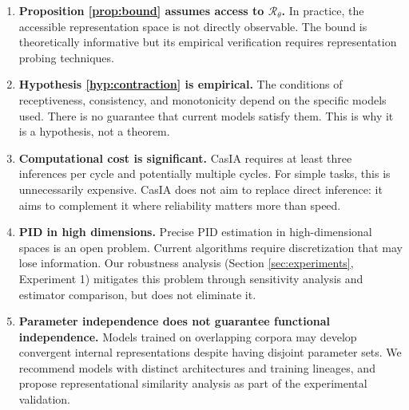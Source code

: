 \documentclass[11pt,a4paper]{article}
\theoremstyle{remark}
\begin{document}
\begin{enumerate}
  \item \textbf{Proposition \ref{prop:bound} assumes access to $\mathcal{R}_\theta$.} In practice, the accessible representation space is not directly observable. The bound is theoretically informative but its empirical verification requires representation probing techniques.
  
  \item \textbf{Hypothesis \ref{hyp:contraction} is empirical.} The conditions of receptiveness, consistency, and monotonicity depend on the specific models used. There is no guarantee that current models satisfy them. This is why it is a hypothesis, not a theorem.
  
  \item \textbf{Computational cost is significant.} CasIA requires at least three inferences per cycle and potentially multiple cycles. For simple tasks, this is unnecessarily expensive. CasIA does not aim to replace direct inference: it aims to complement it where reliability matters more than speed.
  
  \item \textbf{PID in high dimensions.} Precise PID estimation in high-dimensional spaces is an open problem. Current algorithms require discretization that may lose information. Our robustness analysis (Section \ref{sec:experiments}, Experiment 1) mitigates this problem through sensitivity analysis and estimator comparison, but does not eliminate it.
  
  \item \textbf{Parameter independence does not guarantee functional independence.} Models trained on overlapping corpora may develop convergent internal representations despite having disjoint parameter sets. We recommend models with distinct architectures and training lineages, and propose representational similarity analysis as part of the experimental validation.
  

\end{enumerate}
\end{document}

